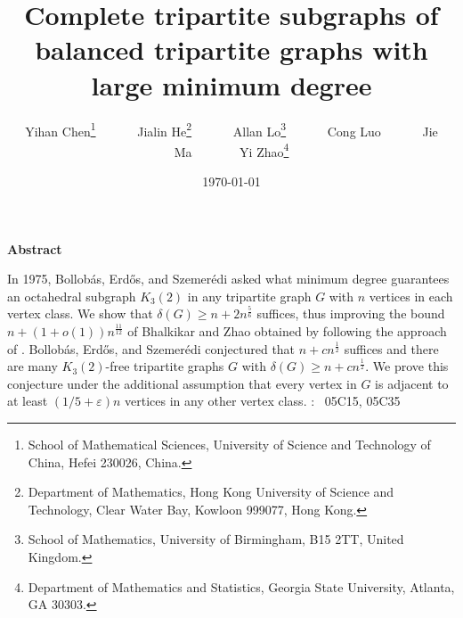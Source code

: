 \documentclass[11pt]{article}
\numberwithin{equation}{section}
\begin{document}
	\textwidth 150mm \textheight 225mm
	
	\title{Complete tripartite subgraphs of balanced tripartite graphs with large minimum degree}
	\author{
		Yihan Chen\footnote{School of Mathematical Sciences, University of Science and Technology of China, Hefei 230026, China.}~~~~~~
		Jialin He\footnote{Department of Mathematics, Hong Kong University of Science and Technology, Clear Water Bay, Kowloon 999077, Hong Kong.}~~~~~~
		Allan Lo\footnote{School of Mathematics, University of Birmingham, B15 2TT, United Kingdom.}~~~~~~
		Cong Luo\footnotemark[1]~~~~~~
		Jie Ma\footnotemark[1]~~~~~~~
		Yi Zhao\footnote{Department of Mathematics and Statistics, Georgia State University, Atlanta, GA 30303.}
	}
	\date{\today}
	\maketitle
	\begin{center}
		\begin{minipage}{120mm}
			\begin{center}
				{\small {\bf Abstract}}
			\end{center}
			{\small In 1975, Bollob\'{a}s, Erd\H{o}s, and Szemer\'{e}di \cite{bollobas1975complete} asked what minimum degree guarantees an octahedral subgraph $K_3(2)$ in any tripartite graph $G$ with $n$ vertices in each vertex class. We show that $\delta(G)\geq n+2n^{\frac{5}{6}}$ suffices, thus improving the bound $n+(1+o(1))n^{\frac{11}{12}}$ of Bhalkikar and Zhao \cite{bhalkikar2023subgraphs} obtained by following the approach of \cite{bollobas1975complete}. Bollob\'{a}s, Erd\H{o}s, and Szemer\'{e}di conjectured that $n+cn^{\frac{1}{2}}$ suffices and there are many $K_3(2)$-free tripartite graphs $G$ with $\delta(G)\geq n+cn^{\frac{1}{2}}$. We prove this conjecture under the additional assumption that every vertex in $G$ is adjacent to at least $(1/5+\varepsilon)n$ vertices in any other vertex class. 
				\vskip 0.1in : \ 05C15, 05C35
			}
		\end{minipage}
	\end{center}
	
\end{document}
